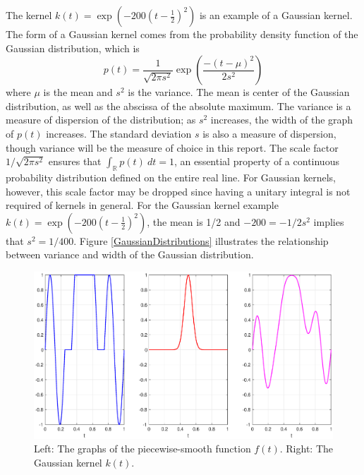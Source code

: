 \documentclass[12pt]{article}
\newcommand{\kcon}{k}
\newcommand{\fcon}{f}
\newcommand{\SD}{s}	%
\begin{document}
The kernel $\kcon(t) = \exp(-200(t-\frac{1}{2})^2)$ is an example of a Gaussian kernel. The form of a Gaussian kernel comes from the probability density function of the Gaussian distribution, which is
\[p(t) = \frac{1}{\sqrt{2\pi\SD^2}}\exp\left(\frac{-(t-\mu)^2}{2\SD^2}\right)\]
where $\mu$ is the mean and $\SD^2$ is the variance. The mean is center of the Gaussian distribution, as well as the abscissa of the absolute maximum. The variance is a measure of dispersion of the distribution; as $\SD^2$ increases, the width of the graph of $p(t)$ increases. The standard deviation $\SD$ is also a measure of dispersion, though variance will be the measure of choice in this report. The scale factor $1/\sqrt{2\pi\SD^2}$ ensures that $\int_{\mathbb{R}} p(t) \: dt = 1$, an essential property of a continuous probability distribution defined on the entire real line. For Gaussian kernels, however, this scale factor may be dropped since having a unitary integral is not required of kernels in general.  For the Gaussian kernel example $\kcon(t) = \exp(-200(t-\frac{1}{2})^2)$, the mean is 1/2 and $-200 = -1/2\SD^2$ implies that $\SD^2 = 1/400$. Figure \ref{GaussianDistributions} illustrates the relationship between variance and width of the Gaussian distribution.

\begin{figure}
	\centerline{\includegraphics[scale=0.4]{Figures/FunctionKernelPlot.eps}}
\caption{Left: The graphs of the piecewise-smooth function $\fcon(t)$. Right: The Gaussian kernel $\kcon(t)$.}
\label{FunctionKernelPlot}
\end{figure}
\end{document}
